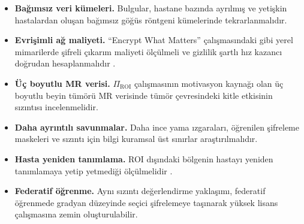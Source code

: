 \begin{itemize}
\item \textbf{Bağımsız veri kümeleri.} Bulgular, hastane bazında ayrılmış ve yetişkin hastalardan oluşan bağımsız göğüs röntgeni kümelerinde tekrarlanmalıdır.
\item \textbf{Evrişimli ağ maliyeti.} ``Encrypt What Matters'' çalışmasındaki gibi yerel mimarilerde şifreli çıkarım maliyeti ölçülmeli ve gizlilik şartlı hız kazancı doğrudan hesaplanmalıdır \cite{backour2026encrypt}.
\item \textbf{Üç boyutlu MR verisi.} $\Pi_{\mathrm{ROI}}$ çalışmasının motivasyon kaynağı olan üç boyutlu beyin tümörü MR verisinde tümör çevresindeki kitle etkisinin sızıntısı incelenmelidir.
\item \textbf{Daha ayrıntılı savunmalar.} Daha ince yama ızgaraları, öğrenilen şifreleme maskeleri ve sızıntı için bilgi kuramsal üst sınırlar araştırılmalıdır.
\item \textbf{Hasta yeniden tanımlama.} ROI dışındaki bölgenin hastayı yeniden tanımlamaya yetip yetmediği ölçülmelidir \cite{packhauser2022reid}.
\item \textbf{Federatif öğrenme.} Aynı sızıntı değerlendirme yaklaşımı, federatif öğrenmede gradyan düzeyinde seçici şifrelemeye taşınarak yüksek lisans çalışmasına zemin oluşturulabilir.
\end{itemize}
